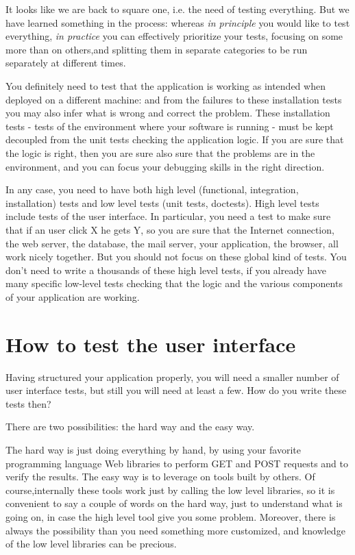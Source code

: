 \documentclass[10pt,a4paper,english]{article}
\begin{document}
It looks like we are back to square one, i.e. the need of testing everything.
But we have learned something in the process: whereas \emph{in principle}
you would like to test everything, \emph{in practice} you can effectively
prioritize your tests, focusing on some more than on others,and
splitting them in separate categories to be run separately at
different times.

You definitely need to test that the 
application is working as intended when deployed on a different
machine: and from the failures to these installation tests you may also infer
what is wrong and correct the problem. These installation tests
- tests of the environment where your software is running - must
be kept decoupled from the unit tests checking the 
application logic. If you are sure that the logic is right, then you are 
sure also sure that the problems are in the environment, and you can 
focus your debugging skills in the right direction.

In any case, you need to have both high level (functional, integration, 
installation) tests and low level tests (unit tests, doctests). High level 
tests include tests of the user interface. In particular, you need a test to 
make sure that if an user click X he gets Y, so you are sure that the
Internet connection, the web server, the database, the mail
server, your application, the browser, all work nicely
together. But you should not focus on these global kind
of tests. You don't need to write a thousands of these 
high level tests, if you already have many specific low-level 
tests checking that the logic and the various components
of your application are working.



\hypertarget{how-to-test-the-user-interface}{}
\section*{How to test the user interface}

Having structured your application properly, you will need a smaller
number of user interface tests, but still you will need at
least a few. How do you write these tests then?

There are two possibilities: the hard way and the easy way.

The hard way is just doing everything by hand, by using your
favorite programming language Web libraries to perform GET and POST
requests and to verify the results. The easy way is to leverage on
tools built by others. Of course,internally these tools work just by calling 
the low level libraries, so it is convenient to say a couple of words on the 
hard way, just to understand what is going on, in case the high level tool 
give you some problem. Moreover, there is always the possibility than
you need something more customized, and knowledge of
the low level libraries can be precious.
\end{document}
